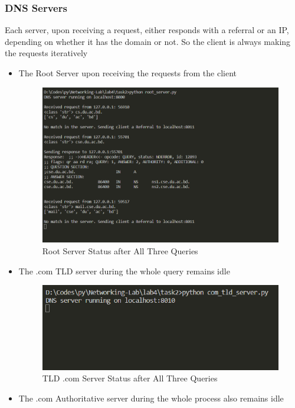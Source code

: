 \documentclass[11pt]{article}
\begin{document}
        \subsubsection*{DNS Servers}
        Each server, upon receiving a request, either responds with a referral or an IP, depending on whether it has the domain or not.
        So the client is always making the requests iteratively
            \begin{itemize}
                \item The Root Server upon receiving the requests from the client
                
                    \begin{figure}[!h]
                        \centering
                        \includegraphics*[width=\textwidth]{task2_server_root.png}
                        \caption{Root Server Status after All Three Queries}
                    \end{figure}
                \FloatBarrier
                \item The .com TLD server during the whole query remains idle
                    
                    \begin{figure}[!h]
                        \centering
                        \includegraphics*[width=\textwidth]{task2_server_com_tld.png}
                        \caption{TLD .com Server Status after All Three Queries}
                    \end{figure}
                \FloatBarrier
                \item The .com Authoritative server during the whole process also remains idle
                    

\end{itemize}
\end{document}
